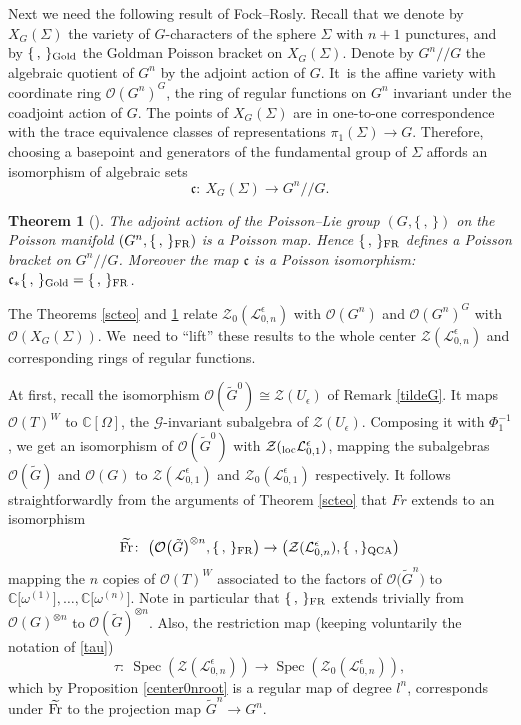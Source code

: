 \documentclass[pdftex]{sigma}%
\numberwithin{equation}{section}
\numberwithin{figure}{section}
\newtheorem{teo}{Theorem}[section]
\newcommand{\e}{\epsilon}
\newcommand{\mc}{\mathbb{C}}
\newcommand{\Ll}{{\mathcal L}}
\newcommand{\lra}{\longrightarrow}
\newcommand{\ra}{\rightarrow}
\begin{document}
Next we need the following result of Fock--Rosly. Recall that we denote by $X_G(\Sigma)$ the variety of $G$-characters of the sphere $\Sigma$ with $n+1$ punctures, and by $\{\, ,\, \}_{\rm Gold}$ the Goldman Poisson bracket on $X_G(\Sigma)$. Denote by $G^n/\!/G$ the algebraic quotient of $G^n$ by the adjoint action of $G$. It~is the affine variety with coordinate ring $\mathcal{O}(G^n)^{G}$, the ring of regular functions on $G^n$ invariant under the coadjoint action of $G$. The points of $X_G(\Sigma)$ are in one-to-one correspondence with the trace equivalence classes of representations $\pi_1(\Sigma)\ra G$. Therefore, choosing a basepoint and generators of the fundamental group of $\Sigma$ affords an isomorphism of algebraic sets %
\[
\mathfrak{c}\colon\ X_G(\Sigma)\ra G^n/\!/G.
\]

\begin{teo}[\cite{FR}] \label{FRteo} The adjoint action of the Poisson--Lie group $(G,\{\, ,\, \})$ on the Poisson manifold $(G^n,\{\, ,\, \}_{\rm FR})$ is a Poisson map. Hence $\{\, ,\, \}_{\rm FR}$ defines a Poisson bracket on $G^n/\!/G$. Moreover the map $\mathfrak{c}$ is a Poisson isomorphism: $\mathfrak{c}_*\{\, ,\, \}_{\rm Gold} = \{\, ,\, \}_{\rm FR}$.
\end{teo}

The Theorems \ref{scteo} and \ref{FRteo} relate $\mathcal{Z}_0(\Ll_{0,n}^\epsilon)$ with $\mathcal{O}(G^n)$ and $\mathcal{O}(G^n)^G$ with $\mathcal{O}(X_G(\Sigma))$. We~need to ``lift'' these results to the whole center $\mathcal{Z}(\Ll_{0,n}^\epsilon)$ and corresponding rings of regular functions.

At first, recall the isomorphism $\mathcal{O}(\tilde G^0)\cong \mathcal{Z}(U_\epsilon)$ of Remark \ref{tildeG}. It maps $\mathcal{O}(T)^W$ to $\mc[\Omega]$, the $\mathcal{G}$-invariant subalgebra of $\mathcal{Z}(U_\e)$. Composing it with $\Phi_1^{-1}$, we get an isomorphism of $\mathcal{O}(\tilde G^0)$ with $\mathcal{Z}({}_{\rm loc}\Ll_{0,1}^\epsilon)$, mapping the subalgebras $\mathcal{O}(\tilde G)$ and $\mathcal{O}(G)$ to $\mathcal{Z}(\Ll_{0,1}^\epsilon)$ and $\mathcal{Z}_0(\Ll_{0,1}^\epsilon)$ respectively. It follows straightforwardly from the arguments of Theorem \ref{scteo} that $Fr$ extends to an isomorphism
\[
\widetilde{\rm Fr} \colon\ \big(\mathcal{O}\big(\tilde{G}\big)^{\otimes n},\{\, ,\, \}_{\rm FR}\big) \ra \big(\mathcal{Z}(\Ll_{0,n}^\epsilon),\{\ ,\}_{\rm QCA}\big)
\]
mapping the $n$ copies of $\mathcal{O}(T)^W$ associated to the factors of $\mathcal{O}\big(\tilde G^n\big)$ to $\mc\big[\omega^{(1)}\big],\dots,\mc\big[\omega^{(n)}\big]$. Note in particular that $\{\, ,\, \}_{\rm FR}$ extends trivially from $\mathcal{O}(G)^{\otimes n}$ to $\mathcal{O}(\tilde{G})^{\otimes n}$. Also, the restriction map (keeping voluntarily the notation of \eqref{tau})
\begin{equation*}\label{tau-n}
\tau\colon\ \operatorname{Spec}(\mathcal{Z}(\Ll_{0,n}^\epsilon)) \lra \operatorname{Spec}(\mathcal{Z}_0(\Ll_{0,n}^\epsilon)),
\end{equation*}
which by Proposition \ref{center0nroot} is a regular map of degree $l^n$, corresponds under $\widetilde{\rm Fr}$ to the projection map $\tilde G^n\ra G^n$.
\end{document}
